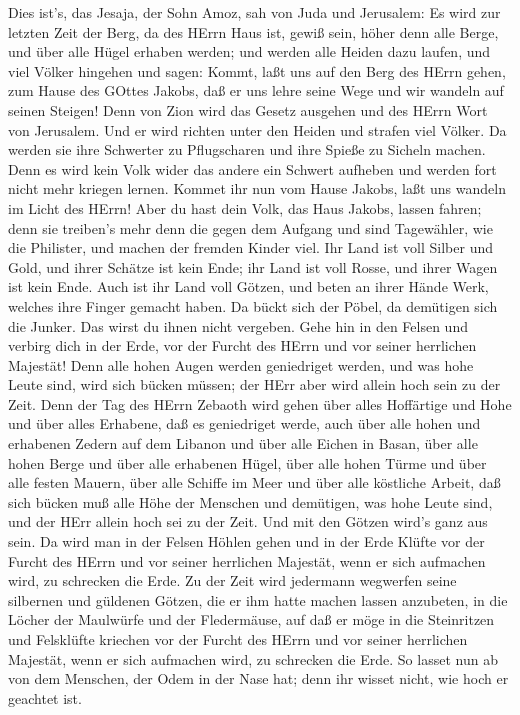  Dies ist's, das Jesaja, der Sohn Amoz, sah von Juda und
Jerusalem:  Es wird zur letzten Zeit der Berg, da des HErrn
Haus ist, gewiß sein, höher denn alle Berge, und über alle Hügel erhaben
werden; und werden alle Heiden dazu laufen,  und viel Völker
hingehen und sagen: Kommt, laßt uns auf den Berg des HErrn gehen, zum
Hause des GOttes Jakobs, daß er uns lehre seine Wege und wir wandeln auf
seinen Steigen! Denn von Zion wird das Gesetz ausgehen und des HErrn
Wort von Jerusalem.  Und er wird richten unter den Heiden
und strafen viel Völker. Da werden sie ihre Schwerter zu Pflugscharen
und ihre Spieße zu Sicheln machen. Denn es wird kein Volk wider das
andere ein Schwert aufheben und werden fort nicht mehr kriegen lernen.
 Kommet ihr nun vom Hause Jakobs, laßt uns wandeln im Licht
des HErrn!  Aber du hast dein Volk, das Haus Jakobs, lassen
fahren; denn sie treiben's mehr denn die gegen dem Aufgang und sind
Tagewähler, wie die Philister, und machen der fremden Kinder viel.
 Ihr Land ist voll Silber und Gold, und ihrer Schätze ist
kein Ende; ihr Land ist voll Rosse, und ihrer Wagen ist kein Ende.
 Auch ist ihr Land voll Götzen, und beten an ihrer Hände
Werk, welches ihre Finger gemacht haben.  Da bückt sich der
Pöbel, da demütigen sich die Junker. Das wirst du ihnen nicht vergeben.
 Gehe hin in den Felsen und verbirg dich in der Erde, vor
der Furcht des HErrn und vor seiner herrlichen Majestät! 
Denn alle hohen Augen werden geniedriget werden, und was hohe Leute
sind, wird sich bücken müssen; der HErr aber wird allein hoch sein zu
der Zeit.  Denn der Tag des HErrn Zebaoth wird gehen über
alles Hoffärtige und Hohe und über alles Erhabene, daß es geniedriget
werde,  auch über alle hohen und erhabenen Zedern auf dem
Libanon und über alle Eichen in Basan,  über alle hohen
Berge und über alle erhabenen Hügel,  über alle hohen Türme
und über alle festen Mauern,  über alle Schiffe im Meer und
über alle köstliche Arbeit,  daß sich bücken muß alle Höhe
der Menschen und demütigen, was hohe Leute sind, und der HErr allein
hoch sei zu der Zeit.  Und mit den Götzen wird's ganz aus
sein.  Da wird man in der Felsen Höhlen gehen und in der
Erde Klüfte vor der Furcht des HErrn und vor seiner herrlichen Majestät,
wenn er sich aufmachen wird, zu schrecken die Erde.  Zu der
Zeit wird jedermann wegwerfen seine silbernen und güldenen Götzen, die
er ihm hatte machen lassen anzubeten, in die Löcher der Maulwürfe und
der Fledermäuse,  auf daß er möge in die Steinritzen und
Felsklüfte kriechen vor der Furcht des HErrn und vor seiner herrlichen
Majestät, wenn er sich aufmachen wird, zu schrecken die Erde.
 So lasset nun ab von dem Menschen, der Odem in der Nase
hat; denn ihr wisset nicht, wie hoch er geachtet ist.

